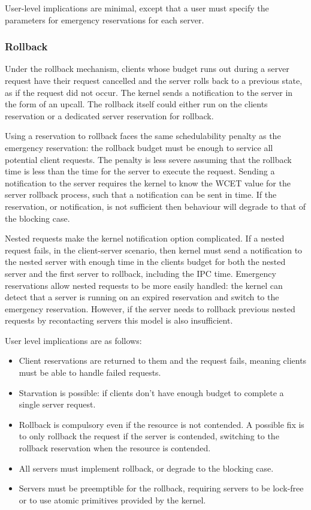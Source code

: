 User-level implications are minimal, except that a user must specify the parameters for emergency reservations for each server.

\subsubsection{Rollback}

Under the rollback mechanism, clients whose budget runs out during a server request have their request cancelled and the server rolls back to a previous state, as if the request did not occur.
The kernel sends a notification to the server in the form of an upcall.
The rollback itself could either run on the clients reservation or a dedicated server reservation for rollback.

Using a reservation to rollback faces the same schedulability penalty as the emergency reservation: the rollback budget must be enough to service all potential client requests.
The penalty is less severe assuming that the rollback time is less than the time for the server to execute the request.
Sending a notification to the server requires the kernel to know the \gls{WCET} value for the server rollback process, such that a notification can be sent in time.
If the reservation, or notification, is not sufficient then behaviour will degrade to that of the blocking case.

Nested requests make the kernel notification option complicated.
If a nested request fails, in the client-server scenario, then kernel must send a notification to the nested server with enough time in the clients budget for both the nested server and the first server to rollback, including the IPC time.
Emergency reservations allow nested requests to be more easily handled: the kernel can detect that a server is running on an expired reservation and switch to the emergency reservation.
However, if the server needs to rollback previous nested requests by recontacting servers this model is also insufficient.

User level implications are as follows:
\begin{itemize}
\item Client reservations are returned to them and the request fails, meaning clients must be able to handle failed requests.
\item Starvation is possible: if clients don't have enough budget to complete a single server request.
\item Rollback is compulsory even if the resource is not contended. A possible fix is to only rollback the request if the server is contended, switching to the rollback reservation when the resource is contended.
\item All servers must implement rollback, or degrade to the blocking case.
\item Servers must be preemptible for the rollback, requiring servers to be lock-free or to use atomic primitives provided by the kernel.
\end{itemize}

